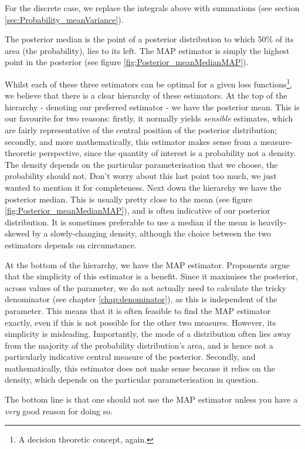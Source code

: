 \documentclass[11pt,fullpage]{book}
\begin{document}
For the discrete case, we replace the integrals above with summations (see section \ref{sec:Probability_meanVariance}). 

The posterior median is the point of a posterior distribution to which 50\% of its area (the probability), lies to its left. The MAP estimator is simply the highest point in the posterior (see figure \ref{fig:Posterior_meanMedianMAP}).

Whilst each of these three estimators can be optimal for a given loss functions\footnote{A decision theoretic concept, again.}, we believe that there is a clear hierarchy of these estimators. At the top of the hierarchy - denoting our preferred estimator - we have the posterior mean. This is our favourite for two reasons: firstly, it normally yields \textit{sensible} estimates, which are fairly representative of the central position of the posterior distribution; secondly, and more mathematically, this estimator makes sense from a measure-theoretic perspective, since the quantity of interest is a probability not a density. The density depends on the particular parameterisation that we choose, the probability should not. Don't worry about this last point too much, we just wanted to mention it for completeness. Next down the hierarchy we have the posterior median. This is usually pretty close to the mean (see figure \ref{fig:Posterior_meanMedianMAP}), and is often indicative of our posterior distribution. It is sometimes preferable to use a median if the mean is heavily-skewed by a slowly-changing density, although the choice between the two estimators depends on circumstance.

At the bottom of the hierarchy, we have the MAP estimator. Proponents argue that the simplicity of this estimator is a benefit. Since it maximises the posterior, across values of the parameter, we do not actually need to calculate the tricky denominator (see chapter \ref{chap:denominator}), as this is independent of the parameter. This means that it is often feasible to find the MAP estimator exactly, even if this is not possible for the other two measures. However, its simplicity is misleading. Importantly, the mode of a distribution often lies away from the majority of the probability distribution's area, and is hence not a particularly indicative central measure of the posterior. Secondly, and mathematically, this estimator does not make sense because it relies on the density, which depends on the particular parameterisation in question.

The bottom line is that one should not use the MAP estimator unless you have a \textit{very} good reason for doing so. 
\end{document}
